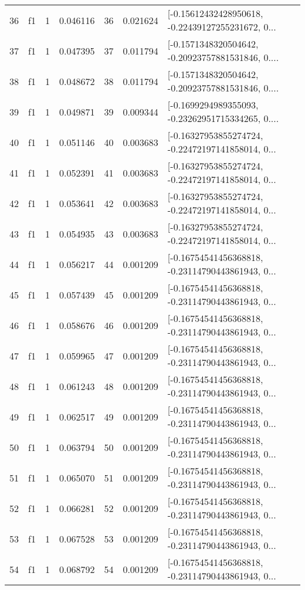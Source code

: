 \begin{tabular}{lllrlrl}
36  &  f1 &   1 &  0.046116 &   36 &  0.021624 &  [-0.15612432428950618, -0.22439127255231672, 0... \\
37  &  f1 &   1 &  0.047395 &   37 &  0.011794 &  [-0.1571348320504642, -0.20923757881531846, 0.... \\
38  &  f1 &   1 &  0.048672 &   38 &  0.011794 &  [-0.1571348320504642, -0.20923757881531846, 0.... \\
39  &  f1 &   1 &  0.049871 &   39 &  0.009344 &  [-0.1699294989355093, -0.23262951715334265, 0.... \\
40  &  f1 &   1 &  0.051146 &   40 &  0.003683 &  [-0.16327953855274724, -0.22472197141858014, 0... \\
41  &  f1 &   1 &  0.052391 &   41 &  0.003683 &  [-0.16327953855274724, -0.22472197141858014, 0... \\
42  &  f1 &   1 &  0.053641 &   42 &  0.003683 &  [-0.16327953855274724, -0.22472197141858014, 0... \\
43  &  f1 &   1 &  0.054935 &   43 &  0.003683 &  [-0.16327953855274724, -0.22472197141858014, 0... \\
44  &  f1 &   1 &  0.056217 &   44 &  0.001209 &  [-0.16754541456368818, -0.23114790443861943, 0... \\
45  &  f1 &   1 &  0.057439 &   45 &  0.001209 &  [-0.16754541456368818, -0.23114790443861943, 0... \\
46  &  f1 &   1 &  0.058676 &   46 &  0.001209 &  [-0.16754541456368818, -0.23114790443861943, 0... \\
47  &  f1 &   1 &  0.059965 &   47 &  0.001209 &  [-0.16754541456368818, -0.23114790443861943, 0... \\
48  &  f1 &   1 &  0.061243 &   48 &  0.001209 &  [-0.16754541456368818, -0.23114790443861943, 0... \\
49  &  f1 &   1 &  0.062517 &   49 &  0.001209 &  [-0.16754541456368818, -0.23114790443861943, 0... \\
50  &  f1 &   1 &  0.063794 &   50 &  0.001209 &  [-0.16754541456368818, -0.23114790443861943, 0... \\
51  &  f1 &   1 &  0.065070 &   51 &  0.001209 &  [-0.16754541456368818, -0.23114790443861943, 0... \\
52  &  f1 &   1 &  0.066281 &   52 &  0.001209 &  [-0.16754541456368818, -0.23114790443861943, 0... \\
53  &  f1 &   1 &  0.067528 &   53 &  0.001209 &  [-0.16754541456368818, -0.23114790443861943, 0... \\
54  &  f1 &   1 &  0.068792 &   54 &  0.001209 &  [-0.16754541456368818, -0.23114790443861943, 0... \\

\end{tabular}
